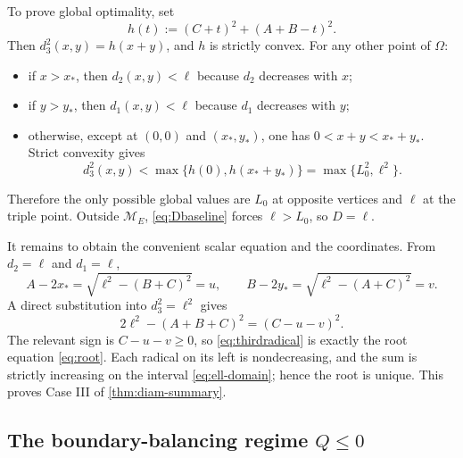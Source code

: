 \documentclass[11pt]{article}
\theoremstyle{definition}
\begin{document}
To prove global optimality, set
\begin{equation}\label{eq:h}
  h(t):=(C+t)^2+(A+B-t)^2.
\end{equation}
Then $d_3^2(x,y)=h(x+y)$, and $h$ is strictly convex.  For any other point of
$\Omega$:
\begin{itemize}[leftmargin=2em]
\item if $x>x_*$, then $d_2(x,y)<\ell$ because $d_2$ decreases with $x$;
\item if $y>y_*$, then $d_1(x,y)<\ell$ because $d_1$ decreases with $y$;
\item otherwise, except at $(0,0)$ and $(x_*,y_*)$, one has
$0<x+y<x_*+y_*$.  Strict convexity gives
\[
 d_3^2(x,y)<\max\{h(0),h(x_*+y_*)\}=\max\{L_0^2,\ell^2\}.
\]
\end{itemize}
Therefore the only possible global values are $L_0$ at opposite vertices and
$\ell$ at the triple point.  Outside $\mathcal M_E$, \eqref{eq:Dbaseline}
forces $\ell>L_0$, so $D=\ell$.

It remains to obtain the convenient scalar equation and the coordinates.  From
$d_2=\ell$ and $d_1=\ell$,
\begin{equation}\label{eq:recoverxy}
 A-2x_*=\sqrt{\ell^2-(B+C)^2}=u,
 \qquad
 B-2y_*=\sqrt{\ell^2-(A+C)^2}=v.
\end{equation}
A direct substitution into $d_3^2=\ell^2$ gives
\begin{equation}\label{eq:thirdradical}
  2\ell^2-(A+B+C)^2=(C-u-v)^2.
\end{equation}
The relevant sign is $C-u-v\ge0$, so \eqref{eq:thirdradical} is exactly the
root equation \eqref{eq:root}.  Each radical on its left is nondecreasing, and
the sum is strictly increasing on the interval \eqref{eq:ell-domain}; hence
the root is unique.  This proves Case III of \cref{thm:diam-summary}.

\subsection{\texorpdfstring{The boundary-balancing regime $Q\le0$}{The boundary-balancing regime Q <= 0}}
\end{document}
